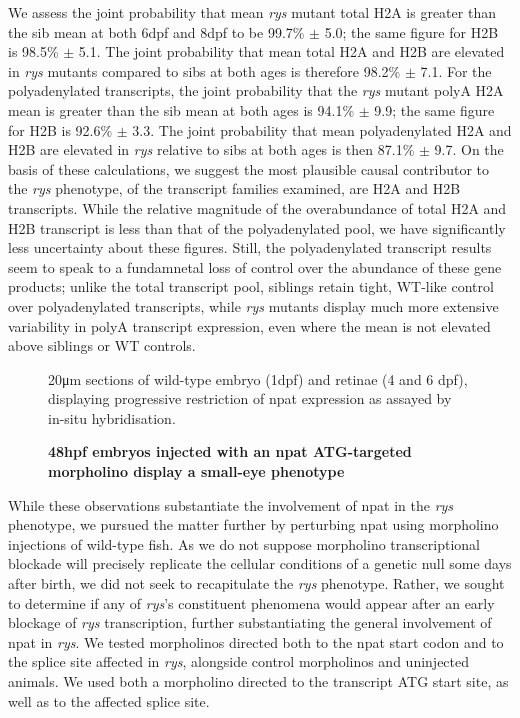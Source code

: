 We assess the joint probability that mean \textit{rys} mutant total H2A is greater than the sib mean at both 6dpf and 8dpf to be 99.7\% $\pm$ 5.0; the same figure for H2B is 98.5\% $\pm$ 5.1. The joint probability that mean total H2A and H2B are elevated in \textit{rys} mutants compared to sibs at both ages is therefore 98.2\% $\pm$ 7.1. For the polyadenylated transcripts, the joint probability that the \textit{rys} mutant polyA H2A mean is greater than the sib mean at both ages is 94.1\% $\pm$ 9.9; the same figure for H2B is 92.6\% $\pm$ 3.3. The joint probability that mean polyadenylated H2A and H2B are elevated in \textit{rys} relative to sibs at both ages is then 87.1\% $\pm$ 9.7. On the basis of these calculations, we suggest the most plausible causal contributor to the \textit{rys} phenotype, of the transcript families examined, are H2A and H2B transcripts. While the relative magnitude of the overabundance of total H2A and H2B transcript is less than that of the polyadenylated pool, we have significantly less uncertainty about these figures. Still, the polyadenylated transcript results seem to speak to a fundamnetal loss of control over the abundance of these gene products; unlike the total transcript pool, siblings retain tight, WT-like control over polyadenylated transcripts, while \textit{rys} mutants display much more extensive variability in polyA transcript expression, even where the mean is not elevated above siblings or WT controls.

\begin{figure}[!h]
    \caption{{\bf 48hpf embryos injected with an npat ATG-targeted morpholino display a small-eye phenotype}}
    20\si{\micro\metre} sections of wild-type embryo (1dpf) and retinae (4 and 6 dpf), displaying progressive restriction of npat expression as assayed by in-situ hybridisation.
    \label{morpholinopics}
\end{figure}

While these observations substantiate the involvement of npat in the \textit{rys} phenotype, we pursued the matter further by perturbing npat using morpholino injections of wild-type fish. As we do not suppose morpholino transcriptional blockade will precisely replicate the cellular conditions of a genetic null some days after birth, we did not seek to recapitulate the \textit{rys} phenotype. Rather, we sought to determine if any of \textit{rys}'s constituent phenomena would appear after an early blockage of \textit{rys} transcription, further substantiating the general involvement of npat in \textit{rys}. We tested morpholinos directed both to the npat start codon and to the splice site affected in \textit{rys}, alongside control morpholinos and uninjected animals. We used both a morpholino directed to the transcript ATG start site, as well as to the affected splice site. 

